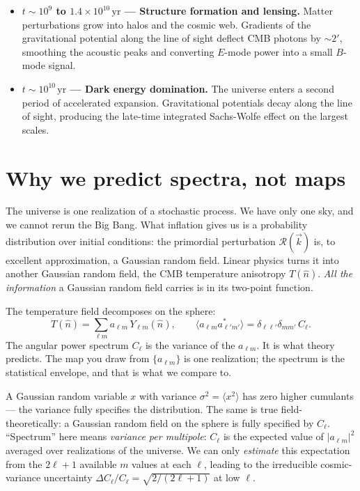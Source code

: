 \begin{itemize}[leftmargin=*]
  \item \textbf{$t \sim 10^{9}$ to $1.4\times 10^{10}\,\mathrm{yr}$ — Structure formation and lensing.}
    Matter perturbations grow into halos and the cosmic web. Gradients of the gravitational potential along the line of sight deflect CMB photons by $\sim 2'$, smoothing the acoustic peaks and converting $E$-mode power into a small $B$-mode signal.

  \item \textbf{$t \sim 10^{10}\,\mathrm{yr}$ — Dark energy domination.}
    The universe enters a second period of accelerated expansion. Gravitational potentials decay along the line of sight, producing the late-time integrated Sachs-Wolfe effect on the largest scales.
\end{itemize}

\section*{Why we predict spectra, not maps}

The universe is one realization of a stochastic process. We have only one sky, and we cannot rerun the Big Bang. What inflation gives us is a probability distribution over initial conditions: the primordial perturbation $\mathcal{R}(\vec{k})$ is, to excellent approximation, a Gaussian random field. Linear physics turns it into another Gaussian random field, the CMB temperature anisotropy $T(\hat{n})$. \emph{All the information} a Gaussian random field carries is in its two-point function.

The temperature field decomposes on the sphere:
\[
  T(\hat{n}) = \sum_{\ell m} a_{\ell m}\, Y_{\ell m}(\hat{n}),
  \qquad
  \langle a_{\ell m} a^*_{\ell' m'} \rangle = \delta_{\ell\ell'} \delta_{m m'}\, C_\ell.
\]
The angular power spectrum $C_\ell$ is the variance of the $a_{\ell m}$. It is what theory predicts. The map you draw from $\{a_{\ell m}\}$ is one realization; the spectrum is the statistical envelope, and that is what we compare to.

\begin{aside}
A Gaussian random variable $x$ with variance $\sigma^2 = \langle x^2 \rangle$ has zero higher cumulants — the variance fully specifies the distribution. The same is true field-theoretically: a Gaussian random field on the sphere is fully specified by $C_\ell$. ``Spectrum'' here means \emph{variance per multipole}: $C_\ell$ is the expected value of $|a_{\ell m}|^2$ averaged over realizations of the universe. We can only \emph{estimate} this expectation from the $2\ell+1$ available $m$ values at each $\ell$, leading to the irreducible cosmic-variance uncertainty $\Delta C_\ell / C_\ell = \sqrt{2/(2\ell+1)}$ at low $\ell$.
\end{aside}


